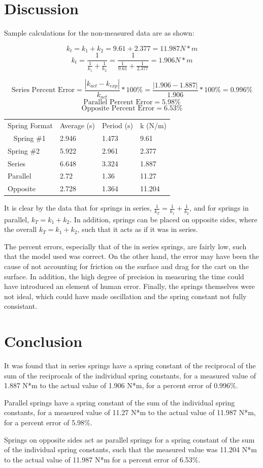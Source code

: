 \documentclass[11pt, titlepage]{article}
\begin{document}
\section*{Discussion}
Sample calculations for the non-measured data are as shown:

$$k_t = k_1 + k_2 = 9.61 + 2.377 = 11.987 N*m$$
$$k_t = \frac{1}{\frac{1}{k_1} + \frac{1}{k_2}} = \frac{1}{\frac{1}{9.61} + \frac{1}{2.377}} = 1.906 N*m$$

$$\text{Series Percent Error} = \frac{|k_{act} - k_{exp}|}{k_{act}} * 100\% = \frac{|1.906 - 1.887|}{1.906} * 100\% = 0.996\% $$ 
$$\text{Parallel Percent Error} = 5.98\% $$
$$\text{Opposite Percent Error} = 6.53\% $$

\begin{center}
\begin{tabular}
{|m{8em}|m{8em}|m{8em}|m{8em}|}
\hline
Spring Format & Average (s) & Period (s) & k (N/m) \\\
\hline
Spring \#1 & 2.946 & 1.473 & 9.61 \\
\hline
Spring \#2 & 5.922 & 2.961 & 2.377 \\
\hline
Series & 6.648 & 3.324 & 1.887 \\
\hline
Parallel & 2.72 & 1.36 & 11.27 \\
\hline
Opposite & 2.728 & 1.364 & 11.204 \\
\hline
\end{tabular}
\end{center}

It is clear by the data that for springs in series, $\frac{1}{k_T} = \frac{1}{k_1} + \frac{1}{k_2}$, and for springs in parallel, $k_T = k_1 + k_2$. In addition, springs can be placed on opposite sides, where the overall $k_T = k_1 + k_2$, such that it acts as if it was in series.

The percent errors, especially that of the in series springs, are fairly low, such that the model used was correct. On the other hand, the error may have been the cause of not accounting for friction on the surface and drag for the cart on the surface. In addition, the high degree of precision in measuring the time could have introduced an element of human error. Finally, the springs themselves were not ideal, which could have made oscillation and the spring constant not fully consistant.

\section*{Conclusion}
It was found that in series springs have a spring constant of the reciprocal of the sum of the reciprocals of the individual spring constants, for a measured value of 1.887 N*m to the actual value of 1.906 N*m, for a percent error of 0.996\%.

Parallel springs have a spring constant of the sum of the individual spring constants, for a measured value of 11.27 N*m to the actual value of 11.987 N*m, for a percent error of 5.98\%.

Springs on opposite sides act as parallel springs for a spring constant of the sum of the individual spring constants, such that the measured value was 11.204 N*m to the actual value of 11.987 N*m for a percent error of 6.53\%.
\end{document}
